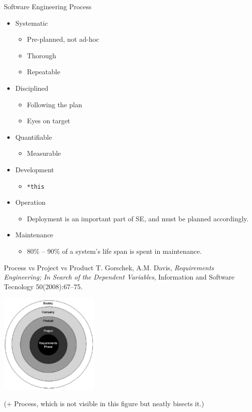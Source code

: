 \documentclass[10pt,t,a4paper]{beamer}
\begin{document}
\begin{frame}[fragile,label=sec-1-2]{Software Engineering Process}
 \begin{itemize}
\item \alert{Systematic}
\begin{itemize}
\item Pre-planned, not ad-hoc
\item Thorough
\item Repeatable
\end{itemize}
\item \alert{Disciplined}
\begin{itemize}
\item Following the plan
\item Eyes on target
\end{itemize}
\item \alert{Quantifiable}
\begin{itemize}
\item Measurable
\end{itemize}
\end{itemize}


\begin{itemize}
\item \alert{Development}
\begin{itemize}
\item \texttt{*this}
\end{itemize}
\item \alert{Operation}
\begin{itemize}
\item Deployment is an important part of SE, and must be planned accordingly.
\end{itemize}
\item \alert{Maintenance}
\begin{itemize}
\item 80\% -- 90\% of a system's life span is spent in maintenance.
\end{itemize}
\end{itemize}
\end{frame}
\begin{frame}[label=sec-1-3]{Process vs Project vs Product}
T. Gorschek, A.M. Davis, \emph{Requirements Engineering; In Search of the Dependent Variables}, Information and Software Tecnology 50(2008):67--75.

\includegraphics[height=5cm]{./IGorschek_Onion.pdf}

(+ Process, which is not visible in this figure but neatly bisects it.)
\end{frame}
\end{document}
